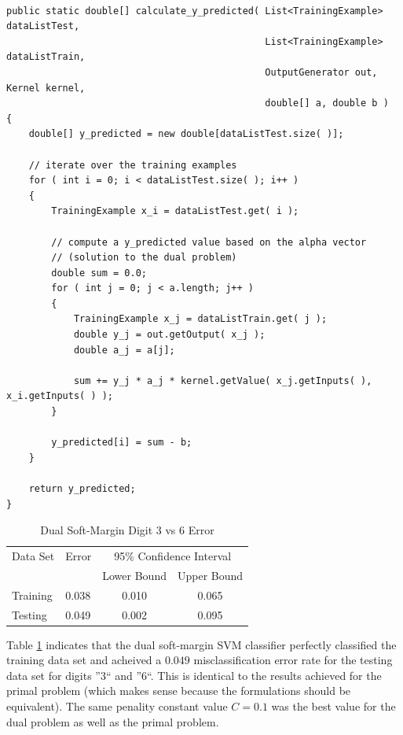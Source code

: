 \documentclass{article}
\begin{document}
\begin{samepage}
\begin{verbatim}

public static double[] calculate_y_predicted( List<TrainingExample> dataListTest,
                                              List<TrainingExample> dataListTrain,
                                              OutputGenerator out, Kernel kernel,
                                              double[] a, double b )
{
    double[] y_predicted = new double[dataListTest.size( )];

    // iterate over the training examples
    for ( int i = 0; i < dataListTest.size( ); i++ )
    {
        TrainingExample x_i = dataListTest.get( i );

        // compute a y_predicted value based on the alpha vector
        // (solution to the dual problem)
        double sum = 0.0;
        for ( int j = 0; j < a.length; j++ )
        {
            TrainingExample x_j = dataListTrain.get( j );
            double y_j = out.getOutput( x_j );
            double a_j = a[j];

            sum += y_j * a_j * kernel.getValue( x_j.getInputs( ), x_i.getInputs( ) );
        }

        y_predicted[i] = sum - b;
    }

    return y_predicted;
}

\end{verbatim}
\end{samepage}

\begin{table}
\caption{Dual Soft-Margin Digit 3 vs 6 Error}
\begin{center}
\begin{tabular}{llcc}
\toprule
Data Set & Error & \multicolumn{2}{c}{95\% Confidence Interval} \\
\cmidrule(r){3-4}
& & Lower Bound & Upper Bound \\
\midrule
Training & 0.038 & 0.010 & 0.065 \\
Testing & 0.049 & 0.002 & 0.095 \\
\bottomrule
\end{tabular}
\end{center}
\label{table2}
\end{table}

Table \ref{table2} indicates that the dual soft-margin SVM classifier perfectly classified the training data set and acheived a \(0.049\) misclassification error rate for the testing data set for digits ''3`` and ''6``. This is identical to the results achieved for the primal problem (which makes sense because the formulations should be equivalent). The same penality constant value \(C=0.1\) was the best value for the dual problem as well as the primal problem.
\end{document}
